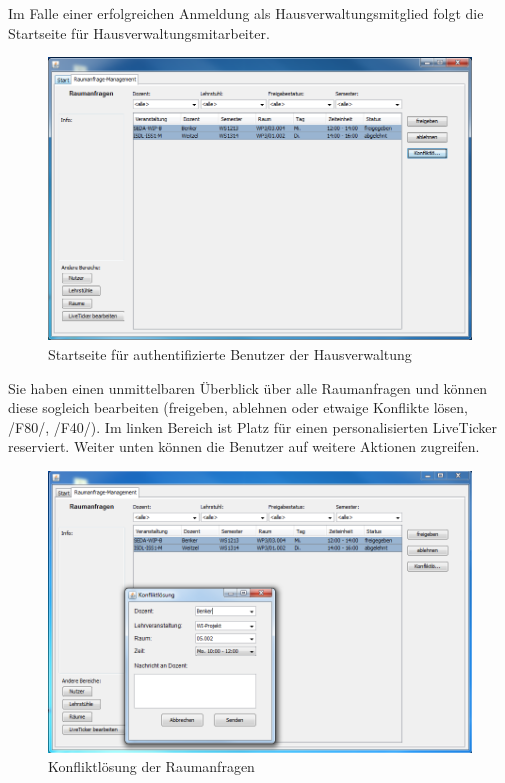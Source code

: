 Im Falle einer erfolgreichen Anmeldung als Hausverwaltungsmitglied folgt die Startseite für Hausverwaltungsmitarbeiter. 
\begin{figure}[H]
\begin{center}
\includegraphics[width=170mm]{images/section_7/VerwaltungHauptseite.PNG}
\caption{Startseite für authentifizierte Benutzer der Hausverwaltung}
\label{img:hauptseiteVerwaltung}
\end{center}
\end{figure}
Sie haben einen unmittelbaren Überblick über alle Raumanfragen und können diese sogleich bearbeiten (freigeben, ablehnen oder etwaige Konflikte lösen, /F80/, /F40/).
Im linken Bereich ist Platz für einen personalisierten LiveTicker reserviert. Weiter unten können die Benutzer auf weitere Aktionen zugreifen.
\begin{figure}[H]
\begin{center}
\includegraphics[width=170mm]{images/section_7/VerwaltungRaumanfragen.PNG}
\caption{Konfliktlösung der Raumanfragen}
\label{img:KonfliktlösungVerwaltung}
\end{center}
\end{figure}
